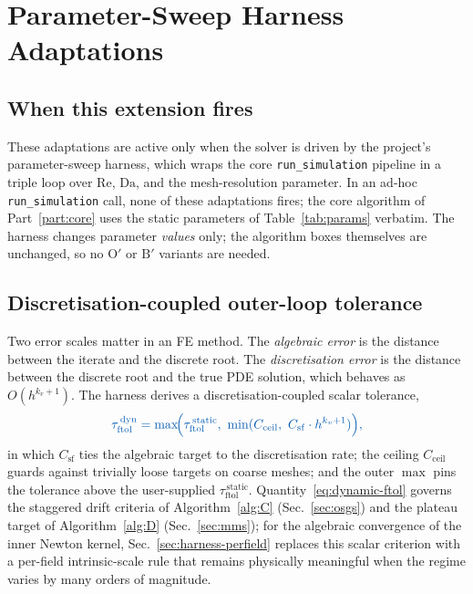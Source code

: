 \documentclass{article}
\newcommand{\code}[1]{\texttt{\small #1}}
\newcommand{\textftol}{\tau_{\mathrm{ftol}}}
\newcommand{\extline}[1]{{\color{extcolor}#1}}
\begin{document}
\section{Parameter-Sweep Harness Adaptations}
\label{sec:harness}

\subsection{When this extension fires}

\extline{These adaptations are active only when the solver is driven by
the project's parameter-sweep harness, which wraps the core
\code{run\_simulation} pipeline in a triple loop over $\mathrm{Re}$,
$\mathrm{Da}$, and the mesh-resolution parameter. In an ad-hoc
\code{run\_simulation} call, none of these adaptations fires; the core
algorithm of Part~\ref{part:core} uses the static parameters of
Table~\ref{tab:params} verbatim. The harness changes parameter
\emph{values} only; the algorithm boxes themselves are unchanged, so
no $\mathrm{O}'$ or $\mathrm{B}'$ variants are needed.}

\subsection{Discretisation-coupled outer-loop tolerance}
\label{sec:harness-ftol}

\extline{Two error scales matter in an FE method. The \emph{algebraic
error} is the distance between the iterate and the discrete root.
The \emph{discretisation error} is the distance between the discrete
root and the true PDE solution, which behaves as $O(h^{k_v+1})$.
The harness derives a discretisation-coupled scalar tolerance,}
\begin{equation}
    \label{eq:dynamic-ftol}
    \textcolor{extcolor}{\textftol^{\,\mathrm{dyn}}
    = \max\!\Bigl(\textftol^{\,\mathrm{static}},\
        \min(C_{\mathrm{ceil}},\ C_{\mathrm{sf}} \cdot h^{k_v+1}) \Bigr),}
\end{equation}
\extline{in which $C_{\mathrm{sf}}$ ties the algebraic target to the
discretisation rate; the ceiling $C_{\mathrm{ceil}}$ guards against
trivially loose targets on coarse meshes; and the outer $\max$ pins
the tolerance above the user-supplied $\textftol^{\,\mathrm{static}}$.
Quantity~\eqref{eq:dynamic-ftol} governs the staggered drift criteria
of Algorithm~\ref{alg:C} (Sec.~\ref{sec:osgs}) and the plateau target
of Algorithm~\ref{alg:D} (Sec.~\ref{sec:mms}); for the
algebraic convergence of the inner Newton kernel,
Sec.~\ref{sec:harness-perfield} replaces this scalar criterion with a
per-field intrinsic-scale rule that remains physically meaningful when
the regime varies by many orders of magnitude.}
\end{document}
